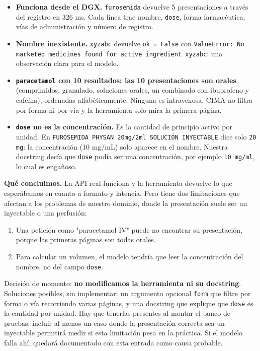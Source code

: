 \begin{itemize}
\tightlist
\item
  \textbf{Funciona desde el DGX.} \texttt{furosemida} devuelve 5 presentaciones a través del registro en
  326 ms. Cada línea trae nombre, \texttt{dose}, forma farmacéutica, vías de administración y número de
  registro.
\item
  \textbf{Nombre inexistente.} \texttt{xyzabc} devuelve \texttt{ok =\allowbreak{} False} con \texttt{ValueError: No marketed medicines found for active ingredient \textquotesingle{}xyzabc\textquotesingle{}}: una observación clara para el modelo.
\item
  \textbf{\texttt{paracetamol} con 10 resultados: las 10 presentaciones son orales} (comprimidos, granulado,
  soluciones orales, un combinado con ibuprofeno y cafeína), ordenadas alfabéticamente. Ninguna
  es intravenosa. CIMA no filtra por forma ni por vía y la herramienta solo mira la primera
  página.
\item
  \textbf{\texttt{dose} no es la concentración.} Es la cantidad de principio activo por unidad. En
  \texttt{FUROSEMIDA PHYSAN 20mg/\allowbreak{}2ml SOLUCIÓN INYECTABLE} dice solo \texttt{20 mg}: la concentración (10 mg/mL)
  solo aparece en el nombre. Nuestra docstring decía que \texttt{dose} podía ser una concentración, por
  ejemplo \texttt{10 mg/\allowbreak{}ml}, lo cual es engañoso.
\end{itemize}

\textbf{Qué concluimos.} La API real funciona y la herramienta devuelve lo que esperábamos en cuanto
a formato y latencia. Pero tiene dos limitaciones que afectan a los problemas de nuestro dominio,
donde la presentación suele ser un inyectable o una perfusión:

\begin{enumerate}
\tightlist
\item
  Una petición como "paracetamol IV" puede no encontrar su presentación, porque las primeras
  páginas son todas orales.
\item
  Para calcular un volumen, el modelo tendría que leer la concentración del nombre, no del campo
  \texttt{dose}.
\end{enumerate}

Decisión de momento: \textbf{no modificamos la herramienta ni su docstring}. Soluciones posibles,
sin implementar: un argumento opcional \texttt{form} que filtre por forma o vía recorriendo varias
páginas, y una docstring que explique que \texttt{dose} es la cantidad por unidad. Hay que tenerlas
presentes al montar el banco de pruebas: incluir al menos un caso donde la presentación correcta
sea un inyectable permitirá medir si esta limitación pesa en la práctica. Si el modelo falla ahí,
quedará documentado con esta entrada como causa probable.

